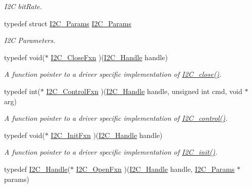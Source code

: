 \begin{DoxyCompactItemize}
\begin{DoxyCompactList}\small\item\em I2\-C bit\-Rate. \end{DoxyCompactList}\item 
typedef struct \hyperlink{struct_i2_c___params}{I2\-C\-\_\-\-Params} \hyperlink{_i2_c_8h_ae6b2a2e3bc3716b5716ad6c1f10d7c1d}{I2\-C\-\_\-\-Params}
\begin{DoxyCompactList}\small\item\em I2\-C Parameters. \end{DoxyCompactList}\item 
typedef void($\ast$ \hyperlink{_i2_c_8h_a4a97bfbbab241bfc50dbad36ce112e74}{I2\-C\-\_\-\-Close\-Fxn} )(\hyperlink{_i2_c_8h_a5809a229f8395c87f59e63128195c1bf}{I2\-C\-\_\-\-Handle} handle)
\begin{DoxyCompactList}\small\item\em A function pointer to a driver specific implementation of \hyperlink{_i2_c_8h_a12c86d89a687f2ee1eb980d99c32326d}{I2\-C\-\_\-close()}. \end{DoxyCompactList}\item 
typedef int($\ast$ \hyperlink{_i2_c_8h_ac269dcf2d893ffe5a5c085c11e4e5f84}{I2\-C\-\_\-\-Control\-Fxn} )(\hyperlink{_i2_c_8h_a5809a229f8395c87f59e63128195c1bf}{I2\-C\-\_\-\-Handle} handle, unsigned int cmd, void $\ast$arg)
\begin{DoxyCompactList}\small\item\em A function pointer to a driver specific implementation of \hyperlink{_i2_c_8h_a633003582213a5098467a4e647cc52f9}{I2\-C\-\_\-control()}. \end{DoxyCompactList}\item 
typedef void($\ast$ \hyperlink{_i2_c_8h_adeda16d09cad1634a29721e4e9bcab00}{I2\-C\-\_\-\-Init\-Fxn} )(\hyperlink{_i2_c_8h_a5809a229f8395c87f59e63128195c1bf}{I2\-C\-\_\-\-Handle} handle)
\begin{DoxyCompactList}\small\item\em A function pointer to a driver specific implementation of \hyperlink{_i2_c_8h_a9ff51ddf1d325776fef90cce0223772b}{I2\-C\-\_\-init()}. \end{DoxyCompactList}\item 
typedef \hyperlink{_i2_c_8h_a5809a229f8395c87f59e63128195c1bf}{I2\-C\-\_\-\-Handle}($\ast$ \hyperlink{_i2_c_8h_a553130379966a990856fd50c30699df7}{I2\-C\-\_\-\-Open\-Fxn} )(\hyperlink{_i2_c_8h_a5809a229f8395c87f59e63128195c1bf}{I2\-C\-\_\-\-Handle} handle, \hyperlink{struct_i2_c___params}{I2\-C\-\_\-\-Params} $\ast$params)

\end{DoxyCompactItemize}
